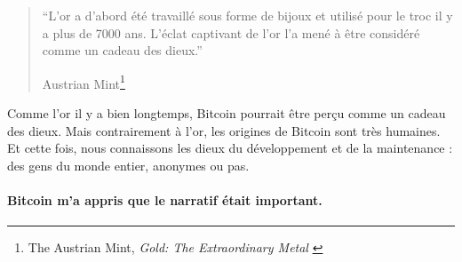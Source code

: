 \begin{quotation}\begin{samepage}
\enquote{L'or a d'abord été travaillé sous forme de bijoux et utilisé pour le
troc il y a plus de 7000 ans. L'éclat captivant de l'or l'a mené à être
considéré comme un cadeau des dieux.}
\begin{flushright} Austrian Mint\footnote{The Austrian Mint, \textit{Gold: The
Extraordinary Metal} \cite{gold-gift-gods}}
\end{flushright}\end{samepage}\end{quotation}

Comme l'or il y a bien longtemps, Bitcoin pourrait être perçu comme un cadeau
des dieux. Mais contrairement à l'or, les origines de Bitcoin sont très
humaines. Et cette fois, nous connaissons les dieux du développement et de la
maintenance : des gens du monde entier, anonymes ou pas.

\paragraph{Bitcoin m'a appris que le narratif était important.}

%
%
%
%
